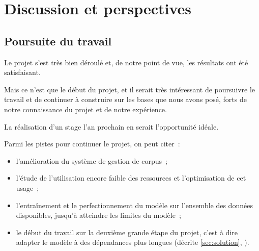 \section{Discussion et perspectives}
\subsection{Poursuite du travail}
Le projet s'est très bien déroulé et, de notre point de vue, les résultats ont été satisfaisant.

Mais ce n'est que le début du projet, et il serait très intéressant de poursuivre le travail et de continuer à construire sur les bases que nous avons posé, forts de notre connaissance du projet et de notre expérience.

La réalisation d'un stage l'an prochain en serait l'opportunité idéale.

Parmi les pistes pour continuer le projet, on peut citer~:
\begin{itemize}
	\item l'amélioration du système de gestion de corpus~;
	\item l'étude de l'utilisation encore faible des ressources et l'optimisation de cet usage~;
	\item l'entraînement et le perfectionnement du modèle sur l'ensemble des données disponibles, jusqu'à atteindre les limites du modèle~;
	\item le début du travail sur la deuxième grande étape du projet, c'est à dire adapter le modèle à des dépendances plus longues (décrite \autoref{sec:solution}, ).
\end{itemize}
